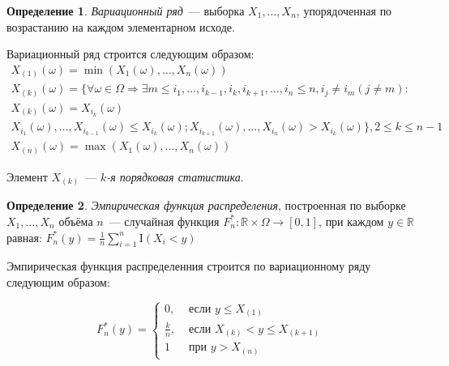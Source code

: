 \documentclass[oneside,final,14pt]{extreport}
\theoremstyle{definition}
\newtheorem{defn}{Определение}[section]
\begin{document}
\begin{defn}
{\it Вариационный ряд}~--- выборка $X_{1}, \ldots, X_{n}$, упорядоченная по возрастанию на каждом элементарном исходе.
\end{defn}
Вариационный ряд строится следующим образом:
\begin{gather*}
    X_{(1)}(\omega)=\min (X_{1}(\omega), \ldots, X_{n}(\omega)) \\
    X_{(k)}(\omega)=\{\forall \omega \in \Omega \Rightarrow \exists m \leqslant i_{1}, \ldots, i_{k-1}, i_{k}, i_{k+1}, \ldots, i_{n} \leqslant n, i_{j} \neq i_{m}(j \neq m): \\ 
    X_{(k)}(\omega)=X_{i_{k}}(\omega) \\
    X_{i_{1}}(\omega), \ldots, X_{i_{k-1}}(\omega) \leqslant X_{i_{k}}(\omega); X_{i_{k+1}}(\omega), \ldots, X_{i_{n}}(\omega)>X_{i_{k}}(\omega)\}, 2 \leqslant k \leqslant n-1 \\
    X_{(n)}(\omega)=\max (X_{1}(\omega), \ldots, X_{n}(\omega))
\end{gather*}

Элемент $X_{(k)}$~--- {\it $k$-я порядковая статистика}.

\begin{defn}
{\it Эмпирическая функция распределения}, построенная по выборке $X_{1}, \ldots, X_{n}$ объёма $n$~--- случайная функция $F_{n}^{*}: \mathbb{R} \times \Omega \rightarrow[0,1]$, при каждом $y \in \mathbb{R}$ равная:
$F_{n}^{*}(y) =\frac{1}{n} \sum_{i=1}^{n} \mathrm{I}\left(X_{i}<y\right)$
\end{defn}

Эмпирическая функция распределенния строится по вариационному ряду следующим образом:

\begin{equation*}
    F_{n}^{*}(y)=\left\{\begin{array}{ll}
    0, & \text { если } y \leqslant X_{(1)} \\
    \frac{k}{n}, & \text { если } X_{(k)}<y \leqslant X_{(k+1)} \\
    1 & \text { при } y>X_{(n)}
    \end{array}\right.
\end{equation*}
\end{document}
